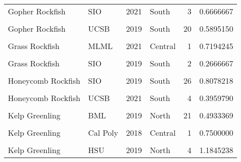 \documentclass[
]{article}
\begin{document}
\begin{longtable}[t]{llrlrr}
Gopher Rockfish & SIO & 2021 & South & 3 & 0.6666667\\
\cellcolor{gray!6}{Gopher Rockfish} & \cellcolor{gray!6}{UCSB} & \cellcolor{gray!6}{2018} & \cellcolor{gray!6}{South} & \cellcolor{gray!6}{55} & \cellcolor{gray!6}{1.0043651}\\
Gopher Rockfish & UCSB & 2019 & South & 20 & 0.5895150\\
\cellcolor{gray!6}{Gopher Rockfish} & \cellcolor{gray!6}{UCSB} & \cellcolor{gray!6}{2021} & \cellcolor{gray!6}{South} & \cellcolor{gray!6}{71} & \cellcolor{gray!6}{1.0958144}\\
\addlinespace
Grass Rockfish & MLML & 2021 & Central & 1 & 0.7194245\\
\cellcolor{gray!6}{Grass Rockfish} & \cellcolor{gray!6}{SIO} & \cellcolor{gray!6}{2018} & \cellcolor{gray!6}{South} & \cellcolor{gray!6}{1} & \cellcolor{gray!6}{0.4615385}\\
Grass Rockfish & SIO & 2019 & South & 2 & 0.2666667\\
\cellcolor{gray!6}{Honeycomb Rockfish} & \cellcolor{gray!6}{SIO} & \cellcolor{gray!6}{2018} & \cellcolor{gray!6}{South} & \cellcolor{gray!6}{26} & \cellcolor{gray!6}{1.0398082}\\
Honeycomb Rockfish & SIO & 2019 & South & 26 & 0.8078218\\
\addlinespace
\cellcolor{gray!6}{Honeycomb Rockfish} & \cellcolor{gray!6}{SIO} & \cellcolor{gray!6}{2021} & \cellcolor{gray!6}{South} & \cellcolor{gray!6}{36} & \cellcolor{gray!6}{1.8248931}\\
Honeycomb Rockfish & UCSB & 2021 & South & 4 & 0.3959790\\
\cellcolor{gray!6}{Kelp Greenling} & \cellcolor{gray!6}{BML} & \cellcolor{gray!6}{2018} & \cellcolor{gray!6}{North} & \cellcolor{gray!6}{53} & \cellcolor{gray!6}{0.9009015}\\
Kelp Greenling & BML & 2019 & North & 21 & 0.4933369\\
\cellcolor{gray!6}{Kelp Greenling} & \cellcolor{gray!6}{BML} & \cellcolor{gray!6}{2021} & \cellcolor{gray!6}{North} & \cellcolor{gray!6}{10} & \cellcolor{gray!6}{0.9884354}\\
\addlinespace
Kelp Greenling & Cal Poly & 2018 & Central & 1 & 0.7500000\\
\cellcolor{gray!6}{Kelp Greenling} & \cellcolor{gray!6}{HSU} & \cellcolor{gray!6}{2018} & \cellcolor{gray!6}{North} & \cellcolor{gray!6}{8} & \cellcolor{gray!6}{1.0419753}\\
Kelp Greenling & HSU & 2019 & North & 4 & 1.1845238\\

\end{longtable}
\end{document}
